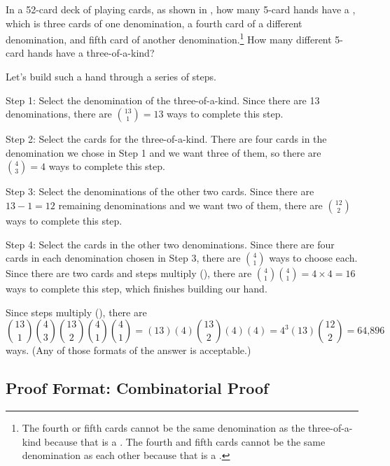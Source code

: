 \begin{exam} 
\label{exam_4ofakind}
    In a 52-card deck of playing cards, as shown in , how many 5-card hands have a , which is three cards of one denomination, a fourth card of a different denomination, and fifth card of another denomination.\footnote{The fourth or fifth cards cannot be the same denomination as the three-of-a-kind because that is a .  The fourth and fifth cards cannot be the same denomination as each other because that is a .}  
    How many different 5-card hands have a three-of-a-kind?
    \begin{soln}
        Let's build such a hand through a series of steps.

        Step 1: Select the denomination of the three-of-a-kind.  Since there are 13 denominations, there are $\binom{13}{1} = 13$ ways to complete this step.

        Step 2: Select the cards for the three-of-a-kind.  There are four cards in the denomination we chose in Step 1 and we want three of them, so there are $\binom{4}{3} = 4$ ways to complete this step.

        Step 3: Select the denominations of the other two cards.  Since there are $13-1=12$ remaining denominations and we want two of them, there are $\binom{12}{2}$ ways to complete this step.  

        Step 4: Select the cards in the other two denominations.  Since there are four cards in each denomination chosen in Step 3, there are $\binom{4}{1}$ ways to choose each. Since there are two cards and steps multiply (), there are $\binom{4}{1}\binom{4}{1} = 4 \times 4 = 16$ ways to complete this step, which finishes building our hand.

        Since steps multiply (), there are 
        $$\binom{13}{1}\binom{4}{3}\binom{13}{2}\binom{4}{1}\binom{4}{1} = (13)(4)\binom{13}{2}(4)(4) =4^3(13)\binom{12}{2}=\text{64,896}$$
        ways. (Any of those formats of the answer is acceptable.)
    \end{soln}
\end{exam}


\newcommand{\subproofscountnosums}{Proof Format: Combinatorial Proof}
\subsection{\subproofscountnosums}
\label{sub_proofs_count_nosums}

